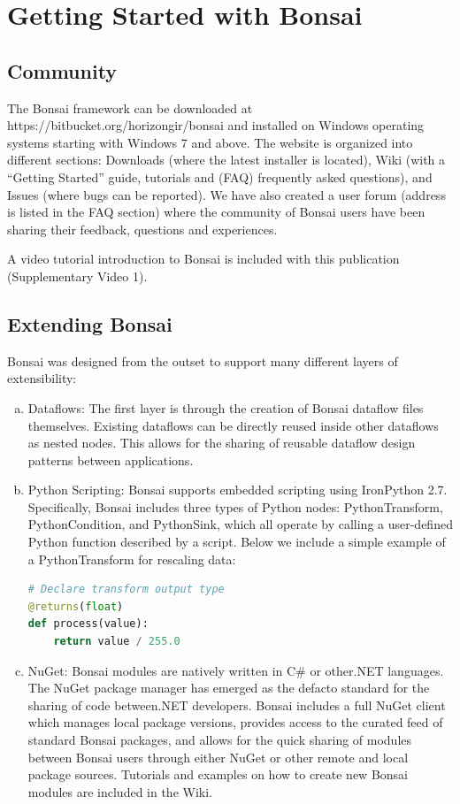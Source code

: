 \section{Getting Started with Bonsai}

\subsection{Community}

The Bonsai framework can be downloaded at https://bitbucket.org/horizongir/bonsai and installed on Windows operating systems starting with Windows 7 and above. The website is organized into different sections: Downloads (where the latest installer is located), Wiki (with a “Getting Started” guide, tutorials and (FAQ) frequently asked questions), and Issues (where bugs can be reported). We have also created a user forum (address is listed in the FAQ section) where the community of Bonsai users have been sharing their feedback, questions and experiences.

A video tutorial introduction to Bonsai is included with this publication (Supplementary Video 1).

\subsection{Extending Bonsai}

Bonsai was designed from the outset to support many different layers of extensibility:
\begin{enumerate}[(a)]
    \item Dataflows: The first layer is through the creation of Bonsai dataflow files themselves. Existing dataflows can be directly reused inside other dataflows as nested nodes. This allows for the sharing of reusable dataflow design patterns between applications.
    \item Python Scripting: Bonsai supports embedded scripting using IronPython 2.7. Specifically, Bonsai includes three types of Python nodes: PythonTransform, PythonCondition, and PythonSink, which all operate by calling a user-defined Python function described by a script. Below we include a simple example of a PythonTransform for rescaling data:

    \begin{lstlisting}[language=Python]
# Declare transform output type
@returns(float)
def process(value):
    return value / 255.0
    \end{lstlisting}

    \item NuGet: Bonsai modules are natively written in C\# or other.NET languages. The NuGet package manager has emerged as the defacto standard for the sharing of code between.NET developers. Bonsai includes a full NuGet client which manages local package versions, provides access to the curated feed of standard Bonsai packages, and allows for the quick sharing of modules between Bonsai users through either NuGet or other remote and local package sources. Tutorials and examples on how to create new Bonsai modules are included in the Wiki.
\end{enumerate}

